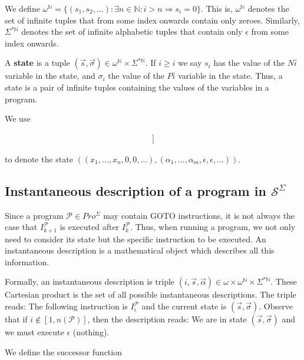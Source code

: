 \documentclass[a4paper, 12pt]{article}
\begin{document}
We define $\omega^{\mathbb{N}} = \{ (s_1, s_2, \ldots) : \exists n \in
\mathbb{N} : i > n \Rightarrow s_i = 0 \}$. This is, $\omega^{\mathbb{N}}$
denotes the set of infinite tuples that from some index onwards contain only
zeroes. Similarly, $\Sigma^{*\mathbb{N}}$ denotes the set of infinite alphabetic
tuples that contain only $\epsilon$ from some index onwards.

A \textbf{state} is a tuple $(\overrightarrow{s}, \overrightarrow{\sigma}) \in
\omega^{\mathbb{N}} \times \Sigma^{*\mathbb{N}}$. If $i \geq i$ we say $s_i$ has
the value of the ${N} \overline{i}$ variable in the state, and $\sigma_i$ the
value of the $P \overline{i}$ variable in the state. Thus, a state is a pair of
infinite tuples containing the values of the variables in a program.

We use 

\begin{align*}
    [\![ x_1, \ldots x_n, ~ \alpha_1, \ldots, \alpha_m ]\!]
\end{align*}

to denote the state $\left( (x_1, \ldots, x_n, 0, 0, \ldots), (\alpha_1, \ldots,
\alpha_m, \epsilon, \epsilon,\ldots) \right) $.

\subsection{Instantaneous description of a program in $\mathcal{S}^{\Sigma}$}

Since a program $\mathcal{P} \in Pro^{\Sigma}$ may contain GOTO instructions,
it is not always the case that $I_{k+1}^{\mathcal{P}}$ is executed after
$I_k^{\mathcal{P}}$. Thus, when running a program, we not only need to consider
its state but the specific instruction to be executed. An instantaneous
description is a mathematical object which describes all this information.

Formally, an instantaneous description is triple $(i, \overrightarrow{s},
\overrightarrow{\alpha}) \in \omega \times \omega^{\mathbb{N}} \times
\Sigma^{*\mathbb{N}}$. These Cartesian product is the set of all possible
instantaneous descriptions. The triple reads: The following instruction is
$I_{i}^{\mathcal{P}}$ and the current state is $(\overrightarrow{s},
\overrightarrow{\sigma})$. Observe that if $i \not\in [1, n(\mathcal{P})]$, then
the description reads: We are in state $(\overrightarrow{s},
\overrightarrow{\sigma})$ and we must execute $\epsilon$ (nothing).

We define the successor function
\end{document}
